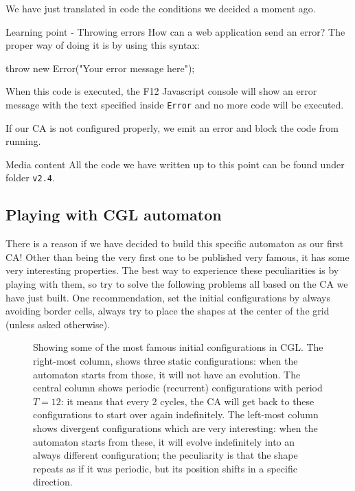 We have just translated in code the conditions we decided a moment ago.

\begin{tips}{Learning point - Throwing errors}
How can a web application send an error? The proper way of doing it is by using this syntax:
\begin{code}
throw new Error("Your error message here");
\end{code}
When this code is executed, the F12 Javascript console will show an error message with the text
specified inside \texttt{Error} and no more code will be executed.
\end{tips}

If our CA is not configured properly, we emit an error and block the code from running.

\begin{trailer}{Media content}
All the code we have written up to this point can be found under folder \texttt{v2.4}.
\end{trailer}

\subsection{Playing with CGL automaton}
There is a reason if we have decided to build this specific automaton as our first CA! Other than being
the very first one to be published very famous, it has some very interesting properties.
The best way to experience these peculiarities is by playing with them, so try to
solve the following problems all based on the CA we have just built. One recommendation,
set the initial configurations by always avoiding border cells, always try to place
the shapes at the center of the grid (unless asked otherwise).

%
\begin{figure}[b]
\sidecaption

%
%
\caption{Showing some of the most famous initial configurations in CGL.
The right-most column, shows three static configurations: when the automaton starts from those,
it will not have an evolution.
The central column shows periodic (recurrent) configurations with period $T=12$: it means that every
2 cycles, the CA will get back to these configurations to start over again indefinitely.
The left-most column shows divergent configurations which are very interesting: when the
automaton starts from these, it will evolve indefinitely into an always different configuration; the
peculiarity is that the shape repeats as if it was periodic, but its position shifts in a
specific direction.}
\label{fig:cglplay}
\end{figure}
%

